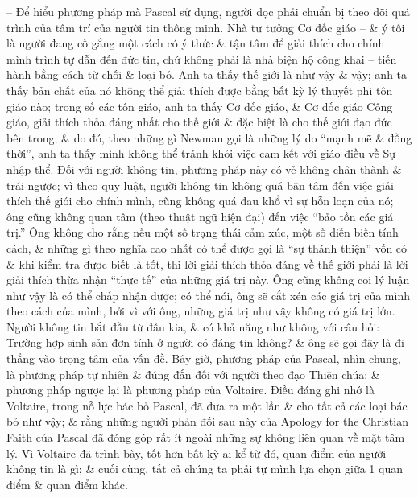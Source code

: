 \documentclass{article}
\begin{document}
\begin{enumerate}
\begin{itemize}
		-- Để hiểu phương pháp mà {\sc Pascal} sử dụng, người đọc phải chuẩn bị theo dõi quá trình của tâm trí của người tin thông minh. Nhà tư tưởng Cơ đốc giáo -- \& ý tôi là người đang cố gắng một cách có ý thức \& tận tâm để giải thích cho chính mình trình tự dẫn đến đức tin, chứ không phải là nhà biện hộ công khai -- tiến hành bằng cách từ chối \& loại bỏ. Anh ta thấy thế giới là như vậy \& vậy; anh ta thấy bản chất của nó không thể giải thích được bằng bất kỳ lý thuyết phi tôn giáo nào; trong số các tôn giáo, anh ta thấy Cơ đốc giáo, \& Cơ đốc giáo Công giáo, giải thích thỏa đáng nhất cho thế giới \& đặc biệt là cho thế giới đạo đức bên trong; \& do đó, theo những gì {\sc Newman} gọi là những lý do ``mạnh mẽ \& đồng thời'', anh ta thấy mình không thể tránh khỏi việc cam kết với giáo điều về Sự nhập thể. Đối với người không tin, phương pháp này có vẻ không chân thành \& trái ngược; vì theo quy luật, người không tin không quá bận tâm đến việc giải thích thế giới cho chính mình, cũng không quá đau khổ vì sự hỗn loạn của nó; ông cũng không quan tâm (theo thuật ngữ hiện đại) đến việc ``bảo tồn các giá trị.'' Ông không cho rằng nếu một số trạng thái cảm xúc, một số diễn biến tính cách, \& những gì theo nghĩa cao nhất có thể được gọi là ``sự thánh thiện'' vốn có \& khi kiểm tra được biết là tốt, thì lời giải thích thỏa đáng về thế giới phải là lời giải thích thừa nhận ``thực tế'' của những giá trị này. Ông cũng không coi lý luận như vậy là có thể chấp nhận được; có thể nói, ông sẽ cắt xén các giá trị của mình theo cách của mình, bởi vì với ông, những giá trị như vậy không có giá trị lớn. Người không tin bắt đầu từ đầu kia, \& có khả năng như không với câu hỏi: Trường hợp sinh sản đơn tính ở người có đáng tin không? \& ông sẽ gọi đây là đi thẳng vào trọng tâm của vấn đề. Bây giờ, phương pháp của {\sc Pascal}, nhìn chung, là phương pháp tự nhiên \& đúng đắn đối với người theo đạo Thiên chúa; \& phương pháp ngược lại là phương pháp của {\sc Voltaire}. Điều đáng ghi nhớ là {\sc Voltaire}, trong nỗ lực bác bỏ {\sc Pascal}, đã đưa ra một lần \& cho tất cả các loại bác bỏ như vậy; \& rằng những người phản đối sau này của Apology for the Christian Faith của {\sc Pascal} đã đóng góp rất ít ngoài những sự không liên quan về mặt tâm lý. Vì {\sc Voltaire} đã trình bày, tốt hơn bất kỳ ai kể từ đó, quan điểm của người không tin là gì; \& cuối cùng, tất cả chúng ta phải tự mình lựa chọn giữa 1 quan điểm \& quan điểm khác.
		

\end{itemize}
\end{enumerate}
\end{document}
